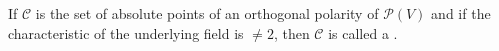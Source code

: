 If $\mathcal{C}$ is the set of absolute points of an orthogonal polarity of $\mathcal{P}(V)$ and if the characteristic of the underlying field is $\neq 2$, then $\mathcal{C}$ is called a .
